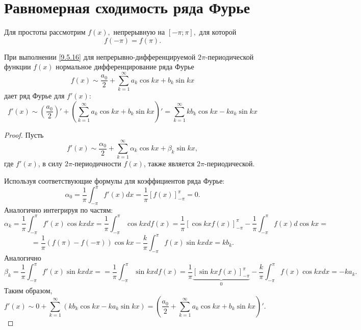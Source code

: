 \documentclass[../../main.tex]{subfiles}
\begin{document}
\section{Равномерная сходимость ряда Фурье}
	Для простоты рассмотрим $f(x),$ непрерывную на $[-\pi; \pi],$ для которой 
	\begin{equation}\label{9.5.16}
	f(-\pi) = f(\pi).
	\end{equation}
	\begin{thm}
		При выполнении \ref{9.5.16} для непрерывно-дифференцируемой 
		$2\pi$-периодической функции $f(x)$ нормальное дифференцирование ряда Фурье
		\[
		f(x) \sim \frac{a_0}{2} + \sum_{k=1}^{\infty}  a_k \cos k x +
		b_k \sin k x
		\]
		дает ряд Фурье для $f'(x):$
		\begin{equation} \label{9.5.17}
			f'(x) \sim \left(\frac{a_0}{2}\right)' + \left(\sum_{k=1}^{\infty}  a_k 
			\cos k x +
			b_k \sin k x\right)' = \sum_{k=1}^{\infty} k b_k \cos k x - k
			a_k \sin k x
		\end{equation}
	\end{thm}
	\begin{proof}
		Пусть
		\[
			f'(x) \sim \frac{\alpha_0}{2} + \sum_{k=1}^{\infty}  \alpha_k \cos k x +
			\beta_k \sin k x,
		\]
		где $f'(x)$, в силу $2\pi$-периодичности $f(x)$, также является 
		$2\pi$-периодической.
		
		Используя соответствующие формулы для коэффициентов ряда Фурье:
		\[
			\alpha_0 = \frac{1}{\pi} \int_{-\pi}^{\pi} f'(x) dx = \frac{1}{\pi} 
			\left[f(x)\right]_{-\pi}^{\pi} = 0.
		\]
		Аналогично интегрируя по частям:
		\[
			\alpha_k = \frac{1}{\pi} \int_{-\pi}^{\pi} f'(x) \cos kx dx = \frac{1}{\pi} 
			\int_{-\pi}^{\pi} \cos kx df(x)  = \frac{1}{\pi} \left[\cos kx 
			f(x)\right]_{-\pi}^{\pi} -
			\frac{1}{\pi} \int_{-\pi}^{\pi} f(x)d \cos kx = 
			\]
			\[ =
			\frac{1}{\pi} (f(\pi) - f(-\pi)) \cos kx -
			\frac{k}{\pi} \int_{-\pi}^{\pi} f(x)\sin kxd x = k b_k.
		\]
		Аналогично
		\[
			\beta_k = \frac{1}{\pi} \int_{-\pi}^{\pi} f'(x) \sin kx dx =
			= \frac{1}{\pi} \int_{-\pi}^{\pi} \sin kx df(x)  =
			\frac{1}{\pi} \underbrace{\left[\sin kx f(x)\right]_{-\pi}^{\pi}}_{0} -
			\frac{k}{\pi} \int_{-\pi}^{\pi} f(x) \cos kx dx = -ka_k.
		\]
		Таким образом, 
		\[
		f'(x) \sim 0 + \sum_{k=1}^{\infty}( k b_k \cos k x - k
		a_k \sin k x) = \left(\frac{a_0}{2} + \sum_{k=1}^{\infty}  a_k \cos k x +
		b_k \sin k x\right)'.
		\]
	\end{proof}
\end{document}
